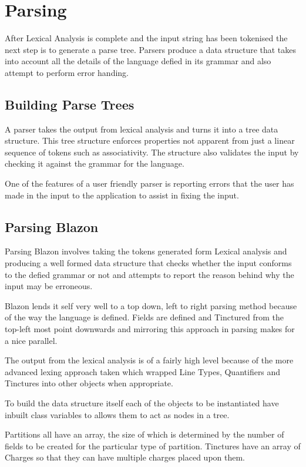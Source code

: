 \chapter{Parsing}

After Lexical Analysis is complete and the input string has been tokenised the next step is to generate a parse tree.  Parsers produce a data structure that takes into account all the details of the language defied in its grammar and also attempt to perform error handing.

\section{Building Parse Trees}

A parser takes the output from lexical analysis and turns it into a tree data structure.  This tree structure enforces properties not apparent from just a linear sequence of tokens such as associativity.  The structure also validates the input by checking it against the grammar for the language.  

One of the features of a user friendly parser is reporting errors that the user has made in the input to the application to assist in fixing the input.


\section{Parsing Blazon}

Parsing Blazon involves taking the tokens generated form Lexical analysis and producing a well formed data structure that checks whether the input conforms to the defied grammar or not and attempts to report the reason behind why the input may be erroneous.

Blazon lends it self very well to a top down, left to right parsing method because of the way the language is defined. Fields are defined and Tinctured from the top-left most point downwards and mirroring this approach in parsing makes for a nice parallel. 

The output from the lexical analysis is of a fairly high level because of the more advanced lexing approach taken which wrapped Line Types, Quantifiers and Tinctures into other objects when appropriate.  

To build the data structure itself each of the objects to be instantiated have inbuilt class variables to allows them to act as nodes in a tree. 

Partitions all have an array, the size of which is determined by the number of fields to be created for the particular type of partition.  Tinctures have an array of Charges so that they can have multiple charges placed upon them. 

